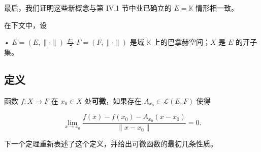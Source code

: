 最后，我们证明这些新概念与第 IV.1 节中业已确立的 $ E = \mathbb{K} $ 情形相一致。

在下文中，设

• $ E = (E, \|\cdot\|) $ 与 $ F = (F, \|\cdot\|) $ 是域 $ \mathbb{K} $ 上的巴拿赫空间；$ X $ 是 $ E $ 的开子集。

\subsection*{定义}

函数 $ f : X \to F $ 在 $ x_0 \in X $ 处\textbf{可微}，如果存在 $ A_{x_0} \in \mathcal{L}(E, F) $ 使得

\begin{equation}
\lim_{x \to x_0} \frac{f(x) - f(x_0) - A_{x_0}(x - x_0)}{\|x - x_0\|} = 0 .\tag{2.1}
\end{equation}

下一个定理重新表述了这个定义，并给出可微函数的最初几条性质。

